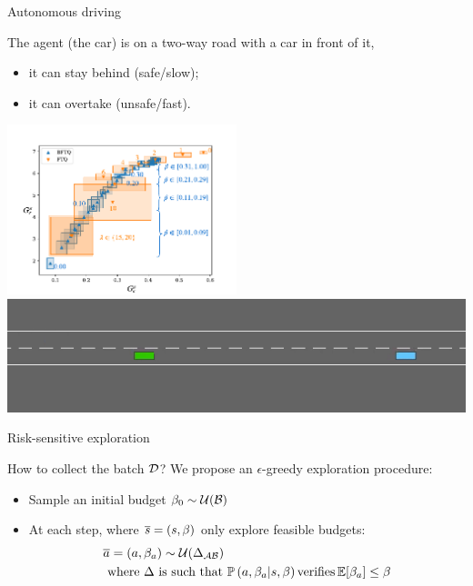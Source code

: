 \documentclass[slideopt,A4,showboxes,svgnames]{beamer}
\begin{document}
\begin{frame}{Autonomous driving}

The agent (the car) is on a two-way road with a car in front of it,
\begin{itemize}
	\item it can {\green stay behind} {\green (safe/slow)};
	\item it can {\red overtake} {\red (unsafe/fast)}.
	\end{itemize}

\begin{center}
\includegraphics[trim={0 0cm 0 0.8cm}, clip, width=0.5\textwidth]{../../source/img/highway.pdf}\\
\href{https://budgeted-rl.github.io/\#driving-styles}{\includegraphics[width=0.5\linewidth]{img/highway_env}}
\end{center}
			
\end{frame}

\begin{frame}{Risk-sensitive exploration}
\begin{alertblock}{How to collect the batch $\mathcal{D}$?}
We propose an $\epsilon$-greedy exploration procedure:
\pause
\begin{itemize}[<+->]
	\item Sample an initial budget $\beta_0\sim\mathcal{U}(\mathcal{B})$
	\item At each step, where $\overline{s}=(s,\beta)$ only explore feasible budgets:
	\begin{align*}
	&\overline{a} = (a, \beta_a)\sim\mathcal{U}(\Delta_{\mathcal{A}\mathcal{B}})\\
	&\text{ where }  \Delta \text{ is such that }\mathbb{P}\left(a, \beta_a|s, \beta\right) \text{verifies} \operatorname*{\mathbb{E}}[\beta_a]\leq\beta
	\end{align*}
\end{itemize}
\end{alertblock}
\end{frame}
\end{document}

